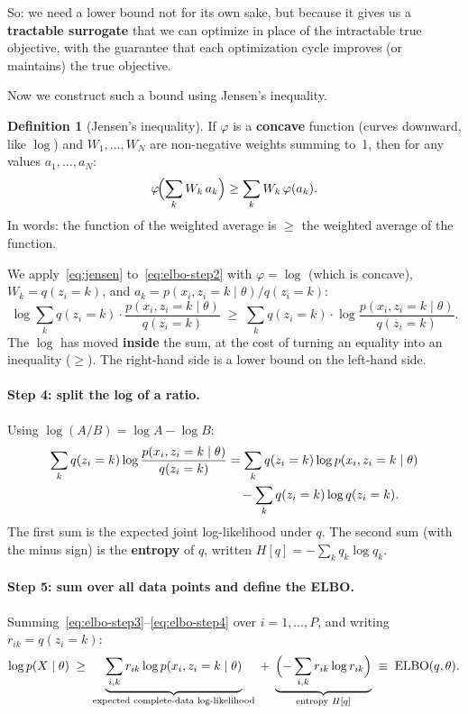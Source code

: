 \documentclass[11pt]{article}
\theoremstyle{definition}
\newtheorem{definition}{Definition}[section]
\theoremstyle{plain}
\theoremstyle{remark}
\begin{document}
So: we need a lower bound not for its own sake, but because it gives us a \textbf{tractable surrogate} that we can optimize in place of the intractable true objective, with the guarantee that each optimization cycle improves (or maintains) the true objective.

Now we construct such a bound using Jensen's inequality.

\begin{definition}[Jensen's inequality]
If $\varphi$ is a \textbf{concave} function (curves downward, like $\log$) and $W_1,\dots,W_N$ are non-negative weights summing to~1, then for any values $a_1,\dots,a_N$:
\begin{equation}
  \varphi\!\Bigl(\sum_k W_k\, a_k\Bigr) \geq \sum_k W_k\,\varphi(a_k).
  \label{eq:jensen}
\end{equation}
In words: the function of the weighted average is $\geq$ the weighted average of the function.
\end{definition}

We apply~\eqref{eq:jensen} to~\eqref{eq:elbo-step2} with $\varphi=\log$ (which is concave), $W_k=q(z_i=k)$, and $a_k=p(x_i,z_i=k\mid\theta)/q(z_i=k)$:
\begin{equation}
  \log\sum_k q(z_i=k)\cdot\frac{p(x_i,z_i=k\mid\theta)}{q(z_i=k)} \;\geq\; \sum_k q(z_i=k)\cdot\log\frac{p(x_i,z_i=k\mid\theta)}{q(z_i=k)}.
  \label{eq:elbo-step3}
\end{equation}
The $\log$ has moved \textbf{inside} the sum, at the cost of turning an equality into an inequality ($\geq$). The right-hand side is a lower bound on the left-hand side.

\paragraph{Step 4: split the log of a ratio.} Using $\log(A/B)=\log A-\log B$:
\begin{align}
  \sum_k q(z_i=k)\log\frac{p(x_i,z_i=k\mid\theta)}{q(z_i=k)} &= \sum_k q(z_i=k)\log p(x_i,z_i=k\mid\theta) \notag \\
  &\quad - \sum_k q(z_i=k)\log q(z_i=k).
  \label{eq:elbo-step4}
\end{align}
The first sum is the expected joint log-likelihood under $q$. The second sum (with the minus sign) is the \textbf{entropy} of $q$, written $H[q]=-\sum_k q_k\log q_k$.

\paragraph{Step 5: sum over all data points and define the ELBO.} Summing~\eqref{eq:elbo-step3}--\eqref{eq:elbo-step4} over $i=1,\dots,P$, and writing $r_{ik}=q(z_i=k)$:
\begin{equation}
  \log p(X\mid\theta) \;\geq\; \underbrace{\sum_{i,k} r_{ik}\log p(x_i,z_i=k\mid\theta)}_{\text{expected complete-data log-likelihood}} \;+\; \underbrace{\Bigl(-\sum_{i,k} r_{ik}\log r_{ik}\Bigr)}_{\text{entropy } H[q]} \;\equiv\; \mathrm{ELBO}(q,\theta).
  \label{eq:elbo}
\end{equation}
\end{document}

